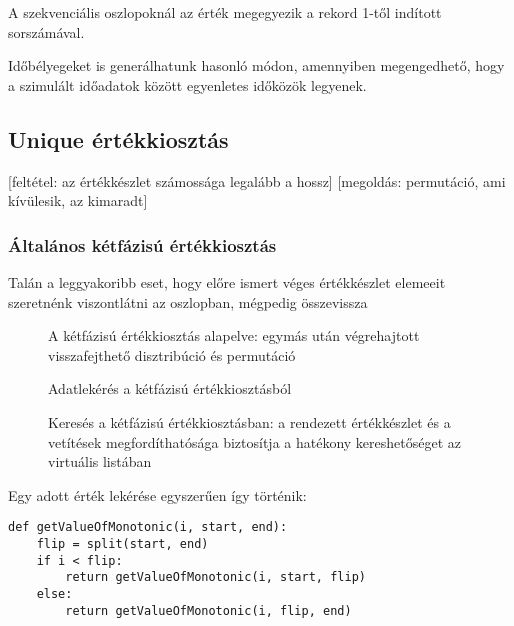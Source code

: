 \documentclass[
    parspace,
    noindent,
    nohyp,
]{elteiktdk}[2023/04/10]
\begin{document}
A szekvenciális oszlopoknál az érték megegyezik a rekord 1-től indított sorszámával.

Időbélyegeket is generálhatunk hasonló módon,
amennyiben megengedhető, hogy a szimulált időadatok között egyenletes időközök legyenek.

\subsection{Unique értékkiosztás}


[feltétel: az értékkészlet számossága legalább a hossz]
[megoldás: permutáció, ami kívülesik, az kimaradt]

\subsubsection{Általános kétfázisú értékkiosztás}


Talán a leggyakoribb eset, hogy előre ismert véges értékkészlet elemeeit szeretnénk viszontlátni az oszlopban,
mégpedig összevissza

\begin{figure}[H]
\centering

\caption{A kétfázisú értékkiosztás alapelve: egymás után végrehajtott visszafejthető disztribúció és permutáció}
\label{A kétfázisú értékkiosztás alapelve}
\end{figure}

\begin{figure}[H]
\centering

\caption{Adatlekérés a kétfázisú értékkiosztásból}
\label{Adatlekérés a kétfázisú értékkiosztásból}
\end{figure}

\begin{figure}[H]
\centering

\caption{Keresés a kétfázisú értékkiosztásban: a rendezett értékkészlet és a vetítések megfordíthatósága biztosítja a hatékony kereshetőséget az virtuális listában}
\label{Keresés a kétfázisú értékkiosztásban}
\end{figure}

Egy adott érték lekérése egyszerűen így történik:

\begin{verbatim}
def getValueOfMonotonic(i, start, end):
    flip = split(start, end)
    if i < flip:
        return getValueOfMonotonic(i, start, flip)
    else:
        return getValueOfMonotonic(i, flip, end)
\end{verbatim}
\end{document}

